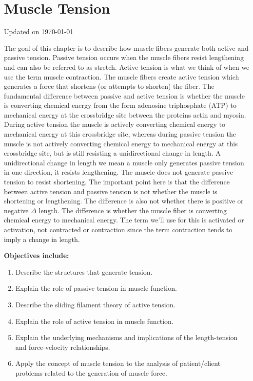 \chapter{Muscle Tension}\label{chp:tension}
Updated on \today
\minitoc

The goal of this chapter is to describe how muscle fibers generate both active and passive tension. Passive tension occurs when the muscle fibers resist lengthening and can also be referred to as stretch. Active tension is what we think of when we use the term muscle contraction. The muscle fibers create active tension which generates a force that shortens (or attempts to shorten) the fiber.  The fundamental difference between passive and active tension is whether the muscle is converting chemical energy from the form adenosine triphosphate (ATP) to mechanical energy at the crossbridge site between the proteins actin and myosin. During active tension the muscle is actively converting chemical energy to mechanical energy at this crossbridge site, whereas during passive tension the muscle is not actively converting chemical energy to mechanical energy at this crossbridge site, but is still resisting a unidirectional change in length. A unidirectional change in length we mean a muscle only generates passive tension in one direction, it resists lengthening. The muscle does not generate passive tension to resist shortening. The important point here is that the difference between active tension and passive tension is not whether the muscle is shortening or lengthening. The difference is also not whether there is positive or negative $\Delta$ length. The difference is whether the muscle fiber is converting chemical energy to mechanical energy. The term we’ll use for this is activated or activation, not contracted or contraction since the term contraction tends to imply a change in length. 

\vspace{5mm}

\textbf{Objectives include:}
\begin{enumerate}
    \item Describe the structures that generate tension.
    \item Explain the role of passive tension in muscle function.
    \item Describe the sliding filament theory of active tension.
    \item Explain the role of active tension in muscle function.
    \item Explain the underlying mechanisms and implications of the length-tension and force-velocity relationships.
   \item Apply the concept of muscle tension to the analysis of patient/client problems related to the generation of muscle force.
\end{enumerate}

